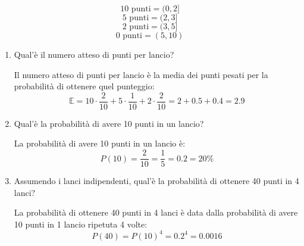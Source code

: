 \documentclass[a4paper]{article}
\theoremstyle{break}
\theoremstyle{break}
\theoremstyle{break}
\theoremstyle{break}
\begin{document}
\[
	10 \text{ punti} = (0,2]
\]
\[
	5 \text{ punti} = (2,3]
\]
\[
	2 \text{ punti} = (3, 5]
\]
\[
	0 \text{ punti} = (5,10)
\]

\begin{enumerate}
	\item Qual'è il numero atteso di punti per lancio?

	      \vspace{1em}
	      Il numero atteso di punti per lancio è la media dei punti pesati per la probabilità
	      di ottenere quel punteggio:
	      \[
		      \mathbb{E} = 10 \cdot \frac{2}{10} + 5 \cdot \frac{1}{10} + 2 \cdot \frac{2}{10} = 2 + 0.5 + 0.4 = 2.9
	      \]
	\item Qual'è la probabilità di avere 10 punti in un lancio?

	      \vspace{1em}
	      La probabilità di avere 10 punti in un lancio è:
	      \[
		      P(10) = \frac{2}{10} = \frac{1}{5} = 0.2 = 20\%
	      \]
	\item Assumendo i lanci indipendenti, qual'è la probabilità di ottenere 40 punti in 4
	      lanci?

	      \vspace{1em}
	      La probabilità di ottenere 40 punti in 4 lanci è data dalla probabilità di avere
	      10 punti in 1 lancio ripetuta 4 volte:
	      \[
		      P(40) = P(10)^4 = 0.2^4 = 0.0016
	      \]
\end{enumerate}
\end{document}
